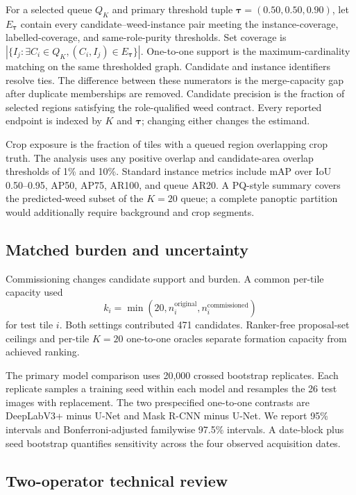 \documentclass[preprint,12pt]{elsarticle}
\begin{document}
For a selected queue $Q_K$ and primary threshold tuple $\boldsymbol{\tau}=(0.50,0.50,0.90)$, let $E_{\boldsymbol{\tau}}$ contain every candidate--weed-instance pair meeting the instance-coverage, labelled-coverage, and same-role-purity thresholds. Set coverage is $|\{I_j:\exists C_i\in Q_K,(C_i,I_j)\in E_{\boldsymbol{\tau}}\}|$. One-to-one support is the maximum-cardinality matching on the same thresholded graph. Candidate and instance identifiers resolve ties. The difference between these numerators is the merge-capacity gap after duplicate memberships are removed. Candidate precision is the fraction of selected regions satisfying the role-qualified weed contract. Every reported endpoint is indexed by $K$ and $\boldsymbol{\tau}$; changing either changes the estimand.

Crop exposure is the fraction of tiles with a queued region overlapping crop truth. The analysis uses any positive overlap and candidate-area overlap thresholds of 1\% and 10\%. Standard instance metrics include mAP over IoU 0.50--0.95, AP50, AP75, AR100, and queue AR20. A PQ-style summary covers the predicted-weed subset of the $K=20$ queue; a complete panoptic partition would additionally require background and crop segments.

\subsection{Matched burden and uncertainty}

Commissioning changes candidate support and burden. A common per-tile capacity used
\begin{equation}
k_i=\min(20,n_i^{\mathrm{original}},n_i^{\mathrm{commissioned}})
\end{equation}
for test tile $i$. Both settings contributed 471 candidates. Ranker-free proposal-set ceilings and per-tile $K=20$ one-to-one oracles separate formation capacity from achieved ranking.

The primary model comparison uses 20,000 crossed bootstrap replicates. Each replicate samples a training seed within each model and resamples the 26 test images with replacement. The two prespecified one-to-one contrasts are DeepLabV3+ minus U-Net and Mask R-CNN minus U-Net. We report 95\% intervals and Bonferroni-adjusted familywise 97.5\% intervals. A date-block plus seed bootstrap quantifies sensitivity across the four observed acquisition dates.

\subsection{Two-operator technical review}
\end{document}
